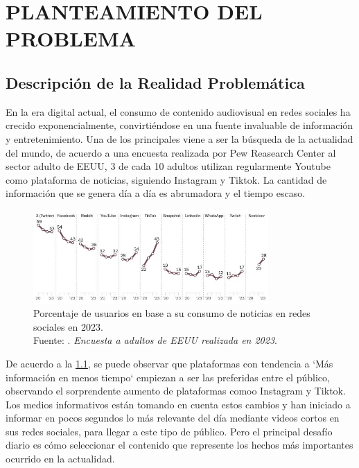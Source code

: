 \chapter{PLANTEAMIENTO DEL PROBLEMA}
\section{Descripción de la Realidad Problemática}

En la era digital actual, el consumo de contenido audiovisual en redes sociales ha crecido exponencialmente, convirtiéndose en una fuente invaluable de información y entretenimiento. 
Una de los principales viene a ser la búsqueda de la actualidad del mundo, de acuerdo a una encuesta realizada por Pew Reasearch Center al sector adulto de EEUU, 3 de cada 10 adultos utilizan regularmente Youtube como plataforma de noticias, siguiendo Instagram y Tiktok. La cantidad de información que se genera día a día es abrumadora y el tiempo escaso.

\begin{figure}[h]
	\centering
	\includegraphics[width=0.80\textwidth]{1/figures/Tendencias_Redes_2023.jpg}
	\caption[Porcentaje de usuarios en base a su consumo de noticias en redes sociales en 2023]{Porcentaje de usuarios en base a su consumo de noticias en redes sociales en 2023. \\ Fuente: \cite{pewresearch_cite}. \textit{Encuesta a adultos de EEUU realizada en 2023}.}
	\label{1:fig}
    
\end{figure}

De acuerdo a la \ref{1:fig}, se puede observar que plataformas con tendencia a `Más información en menos tiempo` empiezan a ser las preferidas entre el público, observando el sorprendente aumento de plataformas comoo Instagram y Tiktok. 
Los medios informativos están tomando en cuenta estos cambios y han iniciado a informar en pocos segundos lo más relevante del día mediante videos cortos en sus redes sociales, para llegar a este tipo de público.
Pero el principal desafío diario es cómo seleccionar el contenido que represente los hechos más importantes ocurrido en la actualidad.

